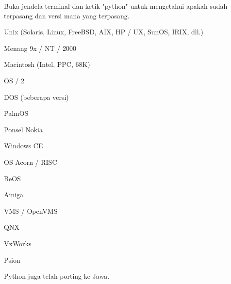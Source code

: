 \noindent 
{\fontsize{14pt}{14pt}\selectfont Buka jendela terminal dan ketik "python" untuk mengetahui apakah sudah terpasang dan versi mana yang terpasang. \\} \par
\vspace{14pt}
\noindent 
{\fontsize{14pt}{14pt}\selectfont Unix (Solaris, Linux, FreeBSD, AIX, HP / UX, SunOS, IRIX, dll.) \\} \par
\noindent 
{\fontsize{14pt}{14pt}\selectfont Menang 9x / NT / 2000 \\} \par
\noindent 
{\fontsize{14pt}{14pt}\selectfont Macintosh (Intel, PPC, 68K) \\} \par
\noindent 
{\fontsize{14pt}{14pt}\selectfont OS / 2 \\} \par
\noindent 
{\fontsize{14pt}{14pt}\selectfont DOS (beberapa versi) \\} \par
\noindent 
{\fontsize{14pt}{14pt}\selectfont PalmOS \\} \par
\noindent 
{\fontsize{14pt}{14pt}\selectfont Ponsel Nokia \\} \par
\noindent 
{\fontsize{14pt}{14pt}\selectfont Windows CE \\} \par
\noindent 
{\fontsize{14pt}{14pt}\selectfont OS Acorn / RISC \\} \par
\noindent 
{\fontsize{14pt}{14pt}\selectfont BeOS \\} \par
\noindent 
{\fontsize{14pt}{14pt}\selectfont Amiga \\} \par
\noindent 
{\fontsize{14pt}{14pt}\selectfont VMS / OpenVMS \\} \par
\noindent 
{\fontsize{14pt}{14pt}\selectfont QNX \\} \par
\noindent 
{\fontsize{14pt}{14pt}\selectfont VxWorks \\} \par
\noindent 
{\fontsize{14pt}{14pt}\selectfont Psion \\} \par
\noindent 
{\fontsize{14pt}{14pt}\selectfont Python juga telah porting ke Jawa. \\} \par
